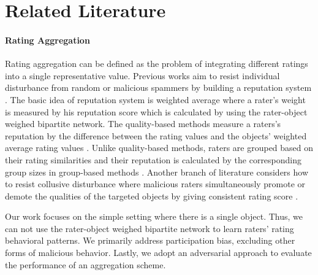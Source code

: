 \section{Related Literature}

\paragraph{Rating Aggregation}

Rating aggregation can be defined as the problem of integrating different ratings into a single representative value. Previous works aim to resist individual disturbance from random or malicious spammers \cite{chirita2005preventing,benevenuto2009detecting} by building a reputation
system \cite{resnick2000reputation,fujimura2003reputation,josang2007survey}. The basic idea of reputation system is weighted average where a rater's weight is measured by his reputation score which is calculated by using the rater-object weighed bipartite network. The quality-based methods measure a raters’s reputation by the difference between the rating values and the objects’ weighted average rating values  \cite{laureti2006information,zhou2011robust,liao2014ranking,zhu2023robust}. Unlike quality-based methods, raters are grouped based on their rating similarities and their reputation is calculated by the corresponding group sizes in group-based methods
\cite{gao2015group,gao2017evaluating,fu2021iterative}. Another branch of literature considers how to resist collusive disturbance where malicious raters simultaneously promote or demote the qualities of the targeted objects by giving consistent rating score \cite{mukherjee2012spotting,wang2016detecting,wang2018graph,zhang2020label,zhu2024robust}.

Our work focuses on the simple setting where there is a single object. Thus, we can not use the rater-object weighed bipartite network to learn raters' rating behavioral patterns. We primarily address participation bias, excluding other forms of malicious behavior. Lastly, we adopt an adversarial approach to evaluate the performance of an aggregation scheme.



